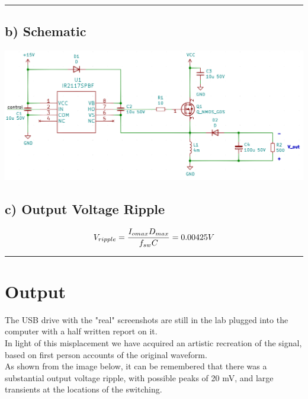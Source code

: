 \documentclass[a4paper,11pt]{article}
\begin{document}
\begin{preview}
\hrule

        \subsection*{b) Schematic}
        \begin{center}
            \includegraphics[width=1\textwidth]{schematic.png}
        \end{center}
        \subsection*{c) Output Voltage Ripple}
            $$V_{ripple}=\frac{I_{omax}D_{max}}{f_{sw}C}=0.00425V\\$$
      
\hrule

    \section{Output}
    The USB drive with the "real" screenshots are still in the lab plugged into the computer with a half written report on it. \\

    In light of this misplacement we have acquired an artistic recreation of the signal, based on first person accounts of the original waveform.\\

    As shown from the image below, it can be remembered that there was a substantial output voltage ripple, with possible peaks of 20 mV, and large transients at the locations of the switching.


\end{preview}
\end{document}
